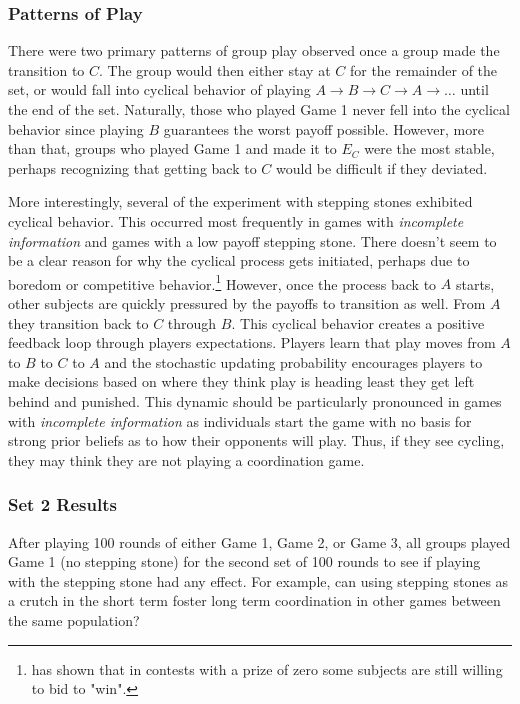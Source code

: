 \subsubsection*{Patterns of Play}

There were two primary patterns of group play observed once a group made the transition to $C$. The group would then either stay at $C$ for the remainder of the set, or would fall into cyclical behavior of playing $A \rightarrow B \rightarrow C \rightarrow A \rightarrow \dots$ until the end of the set. Naturally, those who played Game 1 never fell into the cyclical behavior since playing $B$ guarantees the worst payoff possible. However, more than that, groups who played Game 1 and made it to $E_C$ were the most stable, perhaps recognizing that getting back to $C$ would be difficult if they deviated.

More interestingly, several of the experiment with stepping stones exhibited cyclical behavior. This occurred most frequently in games with \textit{incomplete information} and games with a low payoff stepping stone. There doesn't seem to be a clear reason for why the cyclical process gets initiated, perhaps due to boredom or competitive behavior.\footnote{\cite{sheremeta2010experimental} has shown that in contests with a prize of zero some subjects are still willing to bid to "win".} However, once the process back to $A$ starts, other subjects are quickly pressured by the payoffs to transition as well. From $A$ they transition back to $C$ through $B$. This cyclical behavior creates a positive feedback loop through players expectations. Players learn that play moves from $A$ to $B$ to $C$ to $A$ and the stochastic updating probability encourages players to make decisions based on where they think play is heading least they get left behind and punished. This dynamic should be particularly pronounced in games with \textit{incomplete information} as individuals start the game with no basis for strong prior beliefs as to how their opponents will play. Thus, if they see cycling, they may think they are not playing a coordination game. 

\subsubsection*{Set 2 Results}

After playing 100 rounds of either Game 1, Game 2, or Game 3, all groups played Game 1 (no stepping stone) for the second set of 100 rounds to see if playing with the stepping stone had any effect. For example, can using stepping stones as a crutch in the short term foster long term coordination in other games between the same population? 


